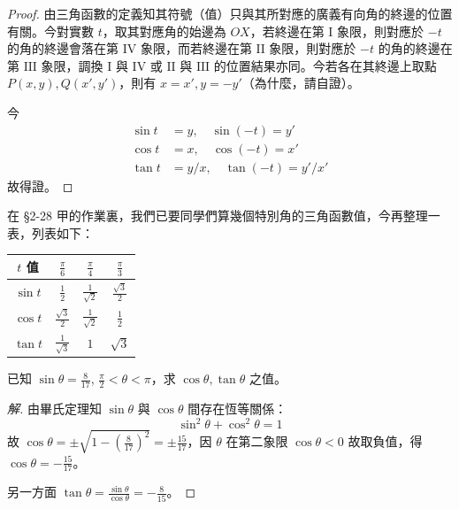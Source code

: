 \begin{proof}
由三角函數的定義知其符號（值）只與其所對應的廣義有向角的終邊的位置有關。今對實數 $t$，取其對應角的始邊為 $OX$，若終邊在第 $\mathrm{I}$ 象限，則對應於 $-t$ 的角的終邊會落在第 $\mathrm{IV}$ 象限，而若終邊在第 $\mathrm{II}$ 象限，則對應於 $-t$ 的角的終邊在第 $\mathrm{III}$ 象限，調換 $\mathrm{I}$ 與 $\mathrm{IV}$ 或 $\mathrm{II}$ 與 $\mathrm{III}$ 的位置結果亦同。今若各在其終邊上取點 $P(x, y), Q(x', y')$，則有 $x = x', y = -y'$（為什麼，請自證）。

今
\begin{align*}
\sin t &= y,\quad \sin(-t) = y' \\
\cos t &= x,\quad \cos(-t) = x' \\
\tan t &= y/x,\quad \tan(-t) = y'/x'
\end{align*}
故得證。
\end{proof}

在 §2-28 甲的作業裏，我們已要同學們算幾個特別角的三角函數值，今再整理一表，列表如下：

\begin{proposition}
\begin{center}
\renewcommand{\arraystretch}{1.3}
\begin{tabular}{|c|c|c|c|}
\hline
$t$ 值 & $\frac{\pi}{6}$ & $\frac{\pi}{4}$ & $\frac{\pi}{3}$ \\ \hline
$\sin t$ & $\frac{1}{2}$ & $\frac{1}{\sqrt{2}}$ & $\frac{\sqrt{3}}{2}$ \\ \hline
$\cos t$ & $\frac{\sqrt{3}}{2}$ & $\frac{1}{\sqrt{2}}$ & $\frac{1}{2}$ \\ \hline
$\tan t$ & $\frac{1}{\sqrt{3}}$ & $1$ & $\sqrt{3}$ \\ \hline
\end{tabular}
\end{center}
\end{proposition}

\begin{example}
已知 $\sin\theta = \frac{8}{17}$, $\frac{\pi}{2} < \theta < \pi$，求 $\cos\theta, \tan\theta$ 之值。
\end{example}

\begin{proof}[解]
由畢氏定理知 $\sin\theta$ 與 $\cos\theta$ 間存在恆等關係：
\[ \sin^2\theta + \cos^2\theta = 1 \]
故 $\cos\theta = \pm\sqrt{1 - \left(\frac{8}{17}\right)^2} = \pm\frac{15}{17}$，因 $\theta$ 在第二象限 $\cos\theta < 0$ 故取負值，得 $\cos\theta = -\frac{15}{17}$。

另一方面 $\tan\theta = \frac{\sin\theta}{\cos\theta} = -\frac{8}{15}$。\qedhere
\end{proof}

